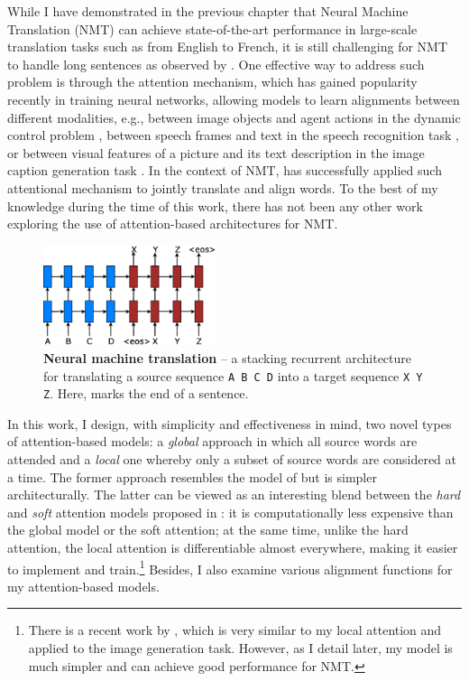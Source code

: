 While I have demonstrated in the previous chapter that Neural Machine Translation (NMT) can achieve state-of-the-art performance in
large-scale translation tasks such as from English to French, it is still challenging for NMT to handle long sentences as observed by .
One effective way to address such problem is through the attention mechanism, which has gained popularity recently in
training neural networks, allowing models to learn alignments between different
modalities, e.g., between image objects and agent actions in the dynamic control
problem \cite{mnih14}, between speech frames and text in the speech recognition
task \cite{jan14},  or between visual features of a picture and its text
description in the image caption generation task \cite{xu15}. In the context of
NMT,  has successfully applied such attentional mechanism to
jointly translate and align words. To the best of my knowledge during the time of this work, there has not
been any other work exploring the use of attention-based architectures for NMT.

\begin{figure}
\centering
\includegraphics[width=0.45\textwidth, clip=true, trim= 0 0 0 0]{img/4-lstm} %
\caption[Neural machine translation]{{\bf Neural machine translation} -- a stacking recurrent architecture for translating a source sequence \texttt{A B C D} into a target sequence \texttt{X Y Z}. Here, \eos{} marks the end of a sentence.
} 
\label{f:lstm}
\end{figure}

In this work, I design, with simplicity and effectiveness in mind, two novel
types of attention-based models: a {\it global} approach in which all source
words are attended and a {\it local} one whereby only a subset of source words
are considered at a time. The former approach resembles the model of
\cite{bog15} but is simpler architecturally. The latter can be viewed as an
interesting blend between the {\it hard} and {\it soft} attention models
proposed in \cite{xu15}: it is computationally less expensive than the
global model or the soft attention; at the same time, unlike the hard attention,
the local attention is
differentiable almost everywhere, making it easier to implement and
train.\footnote{There is a recent work by , which is very
similar to my local attention and applied to the image generation task.
However, as I detail later, my model is much simpler and can achieve good performance for NMT.} Besides, I also examine various
alignment functions for my attention-based models.

